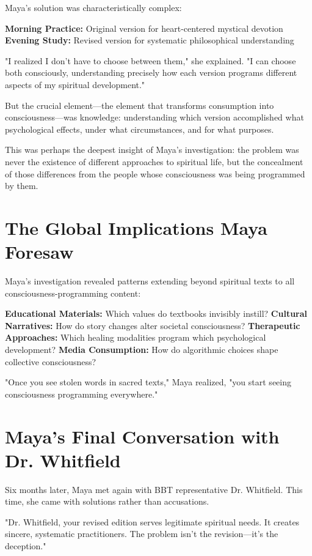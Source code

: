 \documentclass[11pt,twoside]{book}
\begin{document}
Maya's solution was characteristically complex:

\textbf{\textbf{Morning Practice:}} Original version for heart-centered mystical devotion
\textbf{\textbf{Evening Study:}} Revised version for systematic philosophical understanding

"I realized I don't have to choose between them," she explained. "I can choose both consciously, understanding precisely how each version programs different aspects of my spiritual development."

But the crucial element—the element that transforms consumption into consciousness—was knowledge: understanding which version accomplished what psychological effects, under what circumstances, and for what purposes.

This was perhaps the deepest insight of Maya's investigation: the problem was never the existence of different approaches to spiritual life, but the concealment of those differences from the people whose consciousness was being programmed by them.
\section*{The Global Implications Maya Foresaw}
\label{sec:orgfec4f20}

Maya's investigation revealed patterns extending beyond spiritual texts to all consciousness-programming content:

\textbf{\textbf{Educational Materials:}} Which values do textbooks invisibly instill?
\textbf{\textbf{Cultural Narratives:}} How do story changes alter societal consciousness?
\textbf{\textbf{Therapeutic Approaches:}} Which healing modalities program which psychological development?
\textbf{\textbf{Media Consumption:}} How do algorithmic choices shape collective consciousness?

"Once you see stolen words in sacred texts," Maya realized, "you start seeing consciousness programming everywhere."
\section*{Maya's Final Conversation with Dr. Whitfield}
\label{sec:org428e1f3}

Six months later, Maya met again with BBT representative Dr. Whitfield. This time, she came with solutions rather than accusations.

"Dr. Whitfield, your revised edition serves legitimate spiritual needs. It creates sincere, systematic practitioners. The problem isn't the revision—it's the deception."
\end{document}

